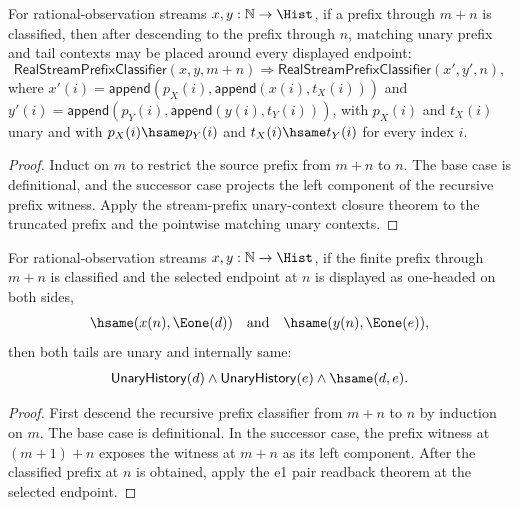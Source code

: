 \begin{theorem}
\label{thm:real-stream-prefix-truncated-unary-context-closed}
For rational-observation streams $x,y:\mathbb{N}\to\Hist$, if a prefix through
$m+n$ is classified, then after descending to the prefix through $n$, matching
unary prefix and tail contexts may be placed around every displayed endpoint:
$$
\mathsf{RealStreamPrefixClassifier}(x,y,m+n)
\Longrightarrow
\mathsf{RealStreamPrefixClassifier}(x',y',n),
$$
where $x'(i)=\mathsf{append}(p_X(i),\mathsf{append}(x(i),t_X(i)))$ and
$y'(i)=\mathsf{append}(p_Y(i),\mathsf{append}(y(i),t_Y(i)))$, with
$p_X(i)$ and $t_X(i)$ unary and with $p_X(i)\hsame p_Y(i)$ and
$t_X(i)\hsame t_Y(i)$ for every index $i$.
\end{theorem}
\begin{proof}
Induct on $m$ to restrict the source prefix from $m+n$ to $n$. The base case is
definitional, and the successor case projects the left component of the
recursive prefix witness. Apply the stream-prefix unary-context closure theorem
to the truncated prefix and the pointwise matching unary contexts.
\end{proof}

\begin{theorem}
\label{thm:real-stream-prefix-truncated-e1-pair-readback}
For rational-observation streams $x,y:\mathbb{N}\to\Hist$, if the finite prefix
through $m+n$ is classified and the selected endpoint at $n$ is displayed as
one-headed on both sides,
$$
\hsame(x(n),\Eone(d))
\quad\text{and}\quad
\hsame(y(n),\Eone(e)),
$$
then both tails are unary and internally same:
$$
\mathsf{UnaryHistory}(d)\wedge \mathsf{UnaryHistory}(e)\wedge \hsame(d,e).
$$
\end{theorem}
\begin{proof}
First descend the recursive prefix classifier from $m+n$ to $n$ by induction on
$m$. The base case is definitional. In the successor case, the prefix witness
at $(m+1)+n$ exposes the witness at $m+n$ as its left component. After the
classified prefix at $n$ is obtained, apply the e1 pair readback theorem at the
selected endpoint.
\end{proof}

